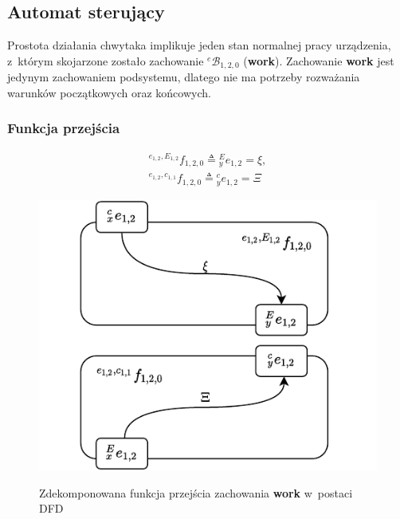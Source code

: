 \subsection{Automat sterujący}
Prostota działania chwytaka implikuje jeden stan normalnej pracy urządzenia, z~którym skojarzone zostało zachowanie ${}^{e}\mathcal{B}_{1,2,0}$ (\textbf{work}). Zachowanie \textbf{work} jest jedynym zachowaniem podsystemu, dlatego nie ma potrzeby rozważania warunków początkowych oraz końcowych. 

\subsubsection{Funkcja przejścia}
\begin{equation}
    \begin{gathered}
        {}^{e_{1,2}, E_{1,2}}f_{1,2,0} \triangleq {}^{E}_{y}e_{1,2} = \xi,\\
        {}^{e_{1,2}, c_{1,1}}f_{1,2,0} \triangleq {}^{c}_{y}e_{1,2} = \Xi
    \end{gathered}
\end{equation}

\begin{figure}
    \centering
    \includegraphics[width=\columnwidth]{figures/ISR-ve-gripper-fp-work.pdf}
    \label{fig:ve-gripper-fp-work}
    \caption{Zdekomponowana funkcja przejścia zachowania \textbf{work} w~postaci DFD}
\end{figure}


